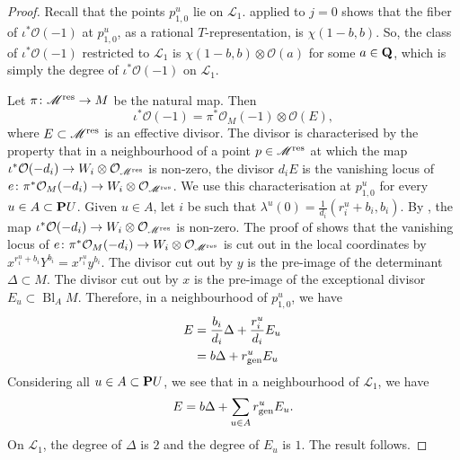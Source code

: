 \documentclass{amsart}
\DeclareMathOperator{\Bl}{Bl}
\renewcommand{\O}{\mathcal O}
\begin{document}
  \begin{proof}
    Recall that the points \(p_{1,0}^u\) lie on \(\mathscr L_1\).
     applied to \(j = 0\) shows that the fiber of \(\iota^{*}\O(-1)\) at \(p_{1,0}^u\), as a rational \(T\)-representation, is \(\chi(1-b,b)\).
    So, the class of \(\iota^{*}\O(-1)\) restricted to \(\mathscr L_{1}\) is \(\chi(1-b,b) \otimes \O(a)\) for some \(a \in \Q\), which is simply the degree of \(\iota^{*}\O(-1)\) on \(\mathscr L_1\).

    Let \(\pi \colon \mathscr M^{\rm res} \to M\) be the natural map.
    Then
    \[ \iota^{*} \O(-1) = \pi^{*} \O_M(-1) \otimes \O(E),\]
    where \(E \subset \mathscr M^{\rm res}\) is an effective divisor.
    The divisor is characterised by the property that in a neighbourhood of a point \(p \in \mathscr M^{\rm res}\) at which the map \(\iota^{*}\O(-d_i) \to W_i \otimes \O_{\mathscr M^{\rm res}}\) is non-zero, the divisor \(d_i E\) is the vanishing locus of \(e \colon \pi^{*} \O_M(-d_i) \to W_i \otimes \O_{\mathscr M^{\rm res}}\).
    We use this characterisation at \(p_{1,0}^u\) for every \(u \in A \subset \P U\).
    Given \(u \in A\), let \(i\) be such that \(\lambda^u(0) = \frac{1}{d_i}(r_i^u+b_i,b_i)\).
    By , the map \(\iota^{*}\O(-d_i) \to W_i \otimes \O_{\mathscr M^{\rm res}}\) is non-zero.
    The proof of  shows that the vanishing locus of \(e \colon \pi^{*} \O_M(-d_i) \to W_i \otimes \O_{\mathscr M^{\rm res}}\) is cut out in the local coordinates by \(x^{r_i^u+b_i}Y^{b_i} = x^{r_i^u}y^{b_i}\).
    The divisor cut out by \(y\) is the pre-image of the determinant \(\Delta \subset M\).
    The divisor cut out by \(x\) is the pre-image of the exceptional divisor \(E_u \subset \Bl_AM\).
    Therefore, in a neighbourhood of \(p_{1,0}^u\), we have
    \begin{align*}
      E &= \frac{b_i}{d_i} \Delta + \frac{r_i^u}{d_i} E_u \\
        &= b \Delta + r_{\rm gen}^u E_u \
    \end{align*}
    Considering all \(u \in A \subset \P U\), we see that in a neighbourhood of \(\mathscr L_1\), we have
    \[ E = b \Delta + \sum_{u \in A} r_{\rm gen}^u E_u.\]
    On \(\mathscr L_1\), the degree of \(\Delta\) is \(2\) and the degree of \(E_u\) is \(1\).
    The result follows.
  \end{proof}
\end{document}
